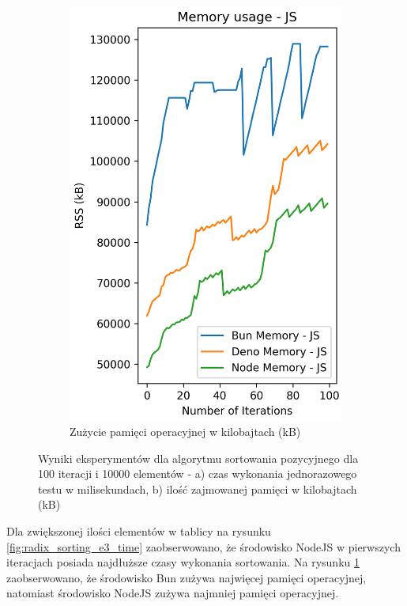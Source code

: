 \begin{figure}[H]
\begin{subfigure}[b]{0.44\textwidth}
  \end{subfigure}
  \begin{subfigure}[b]{0.44\textwidth}
    \centering
    \includegraphics[width=\textwidth]{Figures/sorting/sorting_radix_100_10000_js_memory.png}
    \caption{Zużycie pamięci operacyjnej w kilobajtach (kB)}
    \label{fig:radix_sorting_e3_memory}
  \end{subfigure}
  \caption{Wyniki eksperymentów dla algorytmu sortowania pozycyjnego dla 100 iteracji i 10000 elementów - a) czas wykonania jednorazowego testu w milisekundach, b) ilość zajmowanej pamięci w kilobajtach (kB)}
  \label{fig:radix_sorting_e3}
\end{figure}

Dla zwiększonej ilości elementów w tablicy na rysunku \ref{fig:radix_sorting_e3_time} zaobserwowano, że środowisko NodeJS w pierwszych iteracjach posiada najdłuższe czasy wykonania sortowania. Na rysunku \ref{fig:radix_sorting_e3_memory} zaobserwowano, że środowisko Bun zużywa najwięcej pamięci operacyjnej, natomiast środowisko NodeJS zużywa najmniej pamięci operacyjnej.

